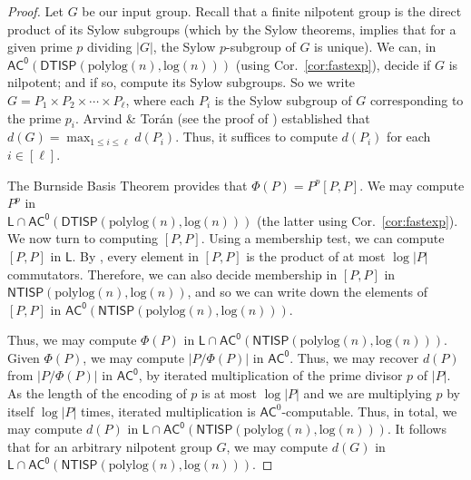 \documentclass{theoretics}
\newcommand{\Cor}[1]{Cor.~\ref{#1}\xspace}
\newcommand*{\ComplexityClass}[1]{\ensuremath{\mathsf{#1}}\xspace}
\newcommand{\NTISP}{\ComplexityClass{NTISP}}
\newcommand{\DTISP}{\ComplexityClass{DTISP}}
\newcommand{\NTISPpll}{\ensuremath{\NTISP(\mathrm{polylog}(n),\mathrm{log}(n))}\xspace}
\newcommand{\DTISPpll}{\ensuremath{\DTISP(\mathrm{polylog}(n),\mathrm{log}(n))}\xspace}
\newcommand*{\LogSpace}{\ComplexityClass{L}}
\newcommand{\AC}{\ComplexityClass{AC}}
\newcommand{\ACz}{\ComplexityClass{AC^0}}
\begin{document}
\begin{proof}
Let $G$ be our input group. Recall that a finite nilpotent group is the direct product of its Sylow subgroups (which by the Sylow theorems, implies that for a given prime $p$ dividing $|G|$, the Sylow $p$-subgroup of $G$ is unique). We can, in $\ACz(\DTISPpll)$ (using \Cor{cor:fastexp}), decide if $G$ is nilpotent; and if so, compute its Sylow subgroups. So we write $G = P_{1} \times P_{2} \times \cdots \times P_{\ell}$, where each $P_{i}$ is the Sylow subgroup of $G$ corresponding to the prime $p_{i}$. Arvind \& Tor\'an (see the proof of \cite[Theorem~7]{ArvindToran}) established that $d(G) = \max_{1 \leq i \leq \ell} d(P_{i})$. Thus, it suffices to compute $d(P_{i})$ for each $i \in [\ell]$.

The Burnside Basis Theorem provides that $\Phi(P) = P^{p}[P,P]$. We may compute $P^{p}$ in \\$\LogSpace \cap \ACz(\DTISPpll)$ (the latter using \Cor{cor:fastexp}). We now turn to computing $[P,P]$.
Using a membership test, we can compute $[P,P]$ in $\LogSpace$.
By \cite[I.§4~Exercise~5]{Serre}, every element in $[P,P]$ is the product of at most $\log |P|$ commutators. 
Therefore, we can also decide membership in $[P,P]$ in $\NTISPpll$, and so we can write down the elements of $[P,P]$ in $\ACz(\NTISPpll)$.

Thus, we may compute $\Phi(P)$ in $\LogSpace \cap \ACz(\NTISPpll)$. Given $\Phi(P)$, we may compute $|P/\Phi(P)|$ in $\ACz$. Thus, we may recover $d(P)$ from $|P/\Phi(P)|$ in $\ACz$, by iterated multiplication of the prime divisor $p$ of $|P|$. As the length of the encoding of $p$ is at most $\log |P|$ and we are multiplying $p$ by itself $\log |P|$ times, iterated multiplication is $\AC^{0}$-computable. Thus, in total, we may compute $d(P)$ in $\LogSpace \cap \ACz(\NTISPpll)$. It follows that for an arbitrary nilpotent group $G$, we may compute $d(G)$ in $\LogSpace \cap \ACz(\NTISPpll)$. 
\end{proof}
\end{document}
